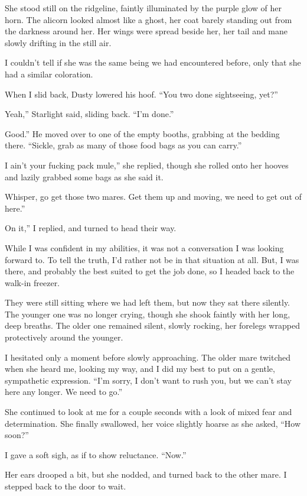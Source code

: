 She stood still on the ridgeline, faintly illuminated by the purple glow of her horn. The alicorn looked almost like a ghost, her coat barely standing out from the darkness around her. Her wings were spread beside her, her tail and mane slowly drifting in the still air.

I couldn’t tell if she was the same being we had encountered before, only that she had a similar coloration.

When I slid back, Dusty lowered his hoof. “You two done sightseeing, yet?”

\leavevmode{}Yeah,” Starlight said, sliding back. “I’m done.”

\leavevmode{}Good.” He moved over to one of the empty booths, grabbing at the bedding there. “Sickle, grab as many of those food bags as you can carry.”

\leavevmode{}I ain’t your fucking pack mule,” she replied, though she rolled onto her hooves and lazily grabbed some bags as she said it.

\leavevmode{}Whisper, go get those two mares. Get them up and moving, we need to get out of here.”

\leavevmode{}On it,” I replied, and turned to head their way.

While I was confident in my abilities, it was not a conversation I was looking forward to. To tell the truth, I’d rather not be in that situation at all. But, I was there, and probably the best suited to get the job done, so I headed back to the walk-in freezer.

They were still sitting where we had left them, but now they sat there silently. The younger one was no longer crying, though she shook faintly with her long, deep breaths. The older one remained silent, slowly rocking, her forelegs wrapped protectively around the younger.

I hesitated only a moment before slowly approaching. The older mare twitched when she heard me, looking my way, and I did my best to put on a gentle, sympathetic expression. “I’m sorry, I don’t want to rush you, but we can’t stay here any longer. We need to go.”

She continued to look at me for a couple seconds with a look of mixed fear and determination. She finally swallowed, her voice slightly hoarse as she asked, “How soon?”

I gave a soft sigh, as if to show reluctance. “Now.”

Her ears drooped a bit, but she nodded, and turned back to the other mare. I stepped back to the door to wait.

